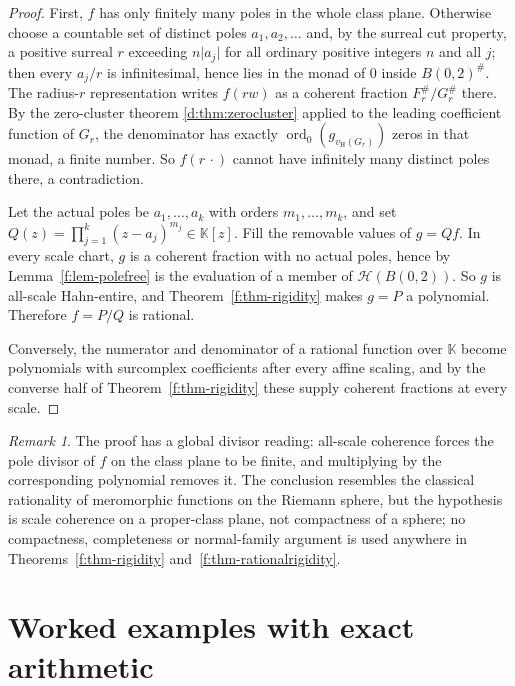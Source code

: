 \documentclass[11pt,a4paper]{article}
\numberwithin{equation}{section}
\theoremstyle{definition}
\theoremstyle{remark}
\newtheorem{remark}[theorem]{Remark}
\theoremstyle{plain}
\newcommand{\K}{\mathbb K}
\DeclareMathOperator{\ord}{ord}
\newcommand{\halo}[1]{#1^{\#}}
\newcommand{\ev}[1]{#1^{\#}}
\newcommand{\Hc}{\mathcal H}
\newcommand{\vH}{v_{\mathrm H}}
\newcommand{\abs}[1]{\lvert #1\rvert}
\begin{document}
\begin{proof}
First, $f$ has only finitely many poles in the whole class plane.
Otherwise choose a countable set of distinct poles $a_{1},a_{2},\dots$
and, by the surreal cut property, a positive surreal $r$ exceeding
$n\abs{a_{j}}$ for all ordinary positive integers $n$ and all $j$; then
every $a_{j}/r$ is infinitesimal, hence lies in the monad of $0$ inside
$\halo{B(0,2)}$.  The radius-$r$ representation writes $f(rw)$ as a
coherent fraction $\ev{F_{r}}/\ev{G_{r}}$ there.  By the zero-cluster
theorem \ref{d:thm:zerocluster} applied to the leading coefficient
function of $G_{r}$, the denominator has exactly
$\ord_{0}(g_{\vH(G_{r})})$ zeros in that monad, a finite number.  So
$f(r\,\cdot)$ cannot have infinitely many distinct poles there, a
contradiction.

Let the actual poles be $a_{1},\dots,a_{k}$ with orders
$m_{1},\dots,m_{k}$, and set
$Q(z)=\prod_{j=1}^{k}(z-a_{j})^{m_{j}}\in\K[z]$.  Fill the removable
values of $g=Qf$.  In every scale chart, $g$ is a coherent fraction with
no actual poles, hence by Lemma~\ref{f:lem-polefree} is the evaluation
of a member of $\Hc(B(0,2))$.  So $g$ is all-scale Hahn-entire, and
Theorem~\ref{f:thm-rigidity} makes $g=P$ a polynomial.  Therefore
$f=P/Q$ is rational.

Conversely, the numerator and denominator of a rational function over
$\K$ become polynomials with surcomplex coefficients after every affine
scaling, and by the converse half of Theorem~\ref{f:thm-rigidity} these
supply coherent fractions at every scale.
\end{proof}

\begin{remark}\label{f:rem-divisor}
The proof has a global divisor reading: all-scale coherence forces the
pole divisor of $f$ on the class plane to be finite, and multiplying by
the corresponding polynomial removes it.  The conclusion resembles the
classical rationality of meromorphic functions on the Riemann sphere,
but the hypothesis is scale coherence on a proper-class plane, not
compactness of a sphere; no compactness, completeness or normal-family
argument is used anywhere in
Theorems~\ref{f:thm-rigidity} and~\ref{f:thm-rationalrigidity}.
\end{remark}


\section{Worked examples with exact arithmetic}\label{f:sec-examples}
\end{document}
